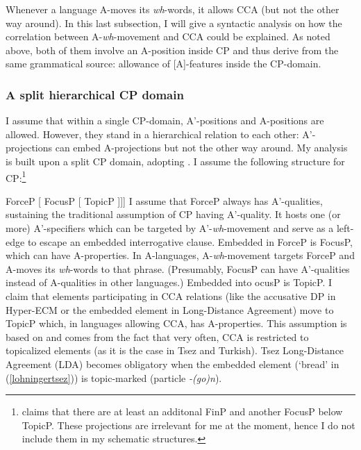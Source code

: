 \documentclass[output=paper,colorlinks,citecolor=brown]{langscibook}
\begin{document}
\ea Whenever a language A-moves its \textit{wh}-words, it allows CCA (but not the other way around).
\z
In this last subsection, I will give a syntactic analysis on how the correlation between A-\textit{wh}-movement and CCA could be explained. As noted above, both of them involve an A-position inside CP and thus derive from the same grammatical source: allowance of [A]-features inside the CP-domain.

\subsubsection{A split hierarchical CP domain}
I assume that within a single CP-domain, A'-positions and A-positions are allowed. However, they stand in a hierarchical relation to each other: A'-projections can embed A-projections but not the other way around. My analysis is built upon a split CP domain, adopting \citet{rizzi1997fine}. I assume the following structure for CP:\footnote{\citet{rizzi1997fine} claims that there are at least an additonal FinP and another FocusP below TopicP. These projections are irrelevant for me at the moment, hence I do not include them in my schematic structures.}

\ea {[} {ForceP} [ {FocusP} [ {TopicP} ]]]\z 
I assume that ForceP always has A'-qualities, sustaining the traditional assumption of CP having A'-quality. It hosts one (or more) A'-specifiers which can be targeted by A'-\textit{wh}-movement and serve as a left-edge to escape an embedded interrogative clause. Embedded in ForceP is FocusP, which can have A-properties. In A-languages, A-\textit{wh}-movement targets ForceP and A-moves its \textit{wh}-words to that phrase. (Presumably, FocusP can have A'-qualities instead of A-qualities in other languages.) Embedded into ocusP is TopicP. I claim that elements participating in CCA relations (like the accusative DP in Hyper-ECM or the embedded element in Long-Distance Agreement) move to TopicP which, in languages allowing CCA, has A-properties. This assumption is based on \citet{csener2008non} and comes from the fact that very often, CCA is restricted to topicalized elements (as it is the case in Tsez and Turkish). Tsez Long-Distance Agreement (LDA) becomes obligatory when the embedded element (`bread' in (\ref{lohningertsez})) is topic-marked (particle \emph{-(go)n}).
\end{document}
